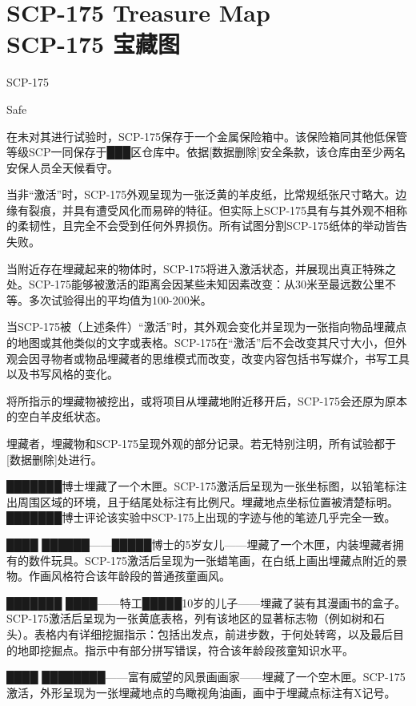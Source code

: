 \chapter[SCP-175 宝藏图]{
    SCP-175 Treasure Map\\
    SCP-175 宝藏图
}

\label{chap:SCP-175}

SCP-175

Safe

在未对其进行试验时，SCP-175保存于一个金属保险箱中。该保险箱同其他低保管等级SCP一同保存于███区仓库中。依据{[}数据删除]安全条款，该仓库由至少两名安保人员全天候看守。

当非“激活”时，SCP-175外观呈现为一张泛黄的羊皮纸，比常规纸张尺寸略大。边缘有裂痕，并具有遭受风化而易碎的特征。但实际上SCP-175具有与其外观不相称的柔韧性，且完全不会受到任何外界损伤。所有试图分割SCP-175纸体的举动皆告失败。

当附近存在埋藏起来的物体时，SCP-175将进入激活状态，并展现出真正特殊之处。SCP-175能够被激活的距离会因某些未知因素改变：从30米至最远数公里不等。多次试验得出的平均值为100-200米。

当SCP-175被（上述条件）“激活”时，其外观会变化并呈现为一张指向物品埋藏点的地图或其他类似的文字或表格。SCP-175在“激活”后不会改变其尺寸大小，但外观会因寻物者或物品埋藏者的思维模式而改变，改变内容包括书写媒介，书写工具以及书写风格的变化。

将所指示的埋藏物被挖出，或将项目从埋藏地附近移开后，SCP-175会还原为原本的空白羊皮纸状态。

埋藏者，埋藏物和SCP-175呈现外观的部分记录。若无特别注明，所有试验都于{[}数据删除]处进行。

███████博士埋藏了一个木匣。SCP-175激活后呈现为一张坐标图，以铅笔标注出周围区域的环境，且于结尾处标注有比例尺。埋藏地点坐标位置被清楚标明。███████博士评论该实验中SCP-175上出现的字迹与他的笔迹几乎完全一致。

████ ██████——█████博士的5岁女儿——埋藏了一个木匣，内装埋藏者拥有的数件玩具。SCP-175激活后呈现为一张蜡笔画，在白纸上画出埋藏点附近的景物。作画风格符合该年龄段的普通孩童画风。

███████ ████——特工█████10岁的儿子——埋藏了装有其漫画书的盒子。SCP-175激活后呈现为一张黄底表格，列有该地区的显著标志物（例如树和石头）。表格内有详细挖掘指示：包括出发点，前进步数，于何处转弯，以及最后目的地即挖掘点。指示中有部分拼写错误，符合该年龄段孩童知识水平。

████ ████████——富有威望的风景画画家——埋藏了一个空木匣。SCP-175激活，外形呈现为一张埋藏地点的鸟瞰视角油画，画中于埋藏点标注有X记号。

